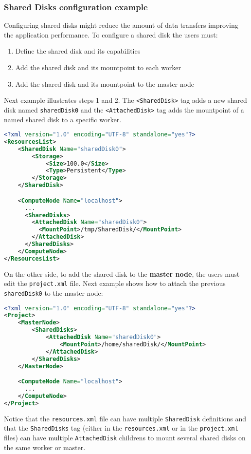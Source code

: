 \subsubsection{Shared Disks configuration example}
Configuring shared disks might reduce the amount of data transfers improving the application performance. To configure a
shared disk the users must:
\begin{enumerate}
 \item Define the shared disk and its capabilities
 \item Add the shared disk and its mountpoint to each worker
 \item Add the shared disk and its mountpoint to the master node
\end{enumerate}

Next example illustrates steps 1 and 2. The \texttt{<SharedDisk>} tag adds a new shared disk named \texttt{sharedDisk0} and the
\texttt{<AttachedDisk>} tag adds the mountpoint of a named shared disk to a specific worker.
\begin{lstlisting}[language=xml]
<?xml version="1.0" encoding="UTF-8" standalone="yes"?>
<ResourcesList>
    <SharedDisk Name="sharedDisk0">
        <Storage>
            <Size>100.0</Size>
            <Type>Persistent</Type>
        </Storage>
    </SharedDisk>

    <ComputeNode Name="localhost">
      ...
      <SharedDisks>
        <AttachedDisk Name="sharedDisk0">
          <MountPoint>/tmp/SharedDisk/</MountPoint>
        </AttachedDisk>
      </SharedDisks>
    </ComputeNode>
</ResourcesList>
\end{lstlisting}

On the other side, to add the shared disk to the \textbf{master node}, the users must edit the \texttt{project.xml} file. Next example
shows how to attach the previous \texttt{sharedDisk0} to the master node:

\newpage

\begin{lstlisting}[language=xml]
<?xml version="1.0" encoding="UTF-8" standalone="yes"?>
<Project>
    <MasterNode>
        <SharedDisks>
            <AttachedDisk Name="sharedDisk0">
                <MountPoint>/home/sharedDisk/</MountPoint>
            </AttachedDisk>
        </SharedDisks>
    </MasterNode>

    <ComputeNode Name="localhost">
      ...
    </ComputeNode>
</Project>
\end{lstlisting}

Notice that the \texttt{resources.xml} file can have multiple \texttt{SharedDisk} definitions and that the \texttt{SharedDisks}
tag (either in the \texttt{resources.xml} or in the \texttt{project.xml} files) can have multiple \texttt{AttachedDisk} childrens
to mount several shared disks on the same worker or master.

